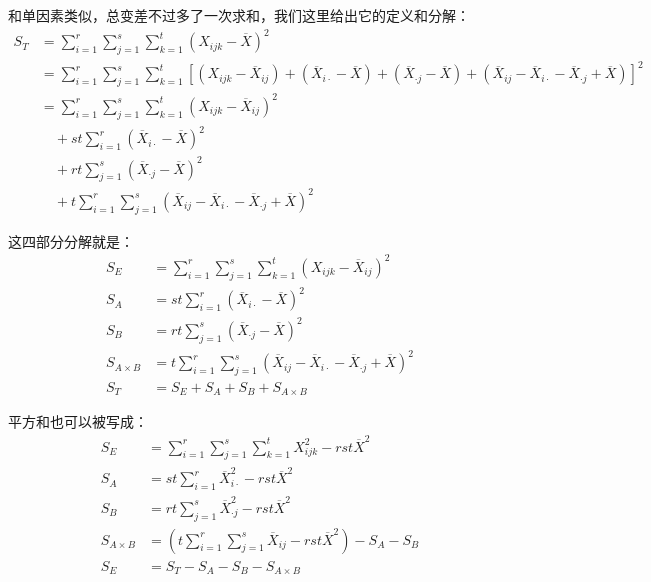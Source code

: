 和单因素类似，总变差不过多了一次求和，我们这里给出它的定义和分解：
\begin{align*}
S_T&=\sum_{i=1}^r\sum_{j=1}^s\sum_{k=1}^t(X_{ijk}-\overline{X})^2\\
&= \sum_{i=1}^r\sum_{j=1}^s\sum_{k=1}^t[(X_{ijk}-\overline{X}_{ij})
+(\overline{X}_{i\cdot}-\overline{X})
+(\overline{X}_{\cdot j}-\overline{X})
+(\overline{X}_{ij}-\overline{X}_{i\cdot}-\overline{X}_{\cdot j}+\overline{X})]^2\\
&= \sum_{i=1}^r\sum_{j=1}^s\sum_{k=1}^t(X_{ijk}-\overline{X}_{ij})^2\\
&\quad+ st\sum_{i=1}^r(\overline{X}_{i\cdot}-\overline{X})^2\\
&\quad+ rt\sum_{j=1}^s(\overline{X}_{\cdot j}-\overline{X})^2\\
&\quad+ t \sum_{i=1}^r\sum_{j=1}^s(\overline{X}_{ij}-\overline{X}_{i\cdot}-\overline{X}_{\cdot j}+\overline{X})^2
\end{align*}

这四部分分解就是：
\begin{align*}
S_E &= \sum_{i=1}^r\sum_{j=1}^s\sum_{k=1}^t(X_{ijk}-\overline{X}_{ij})^2\\
S_A &= st\sum_{i=1}^r(\overline{X}_{i\cdot}-\overline{X})^2\\
S_B &= rt\sum_{j=1}^s(\overline{X}_{\cdot j}-\overline{X})^2\\
S_{A\times B} &= t \sum_{i=1}^r\sum_{j=1}^s(\overline{X}_{ij}-\overline{X}_{i\cdot}-\overline{X}_{\cdot j}+\overline{X})^2\\
S_T &= S_E +S_A + S_B+S_{A\times B}
\end{align*}

平方和也可以被写成：
\begin{align*}
S_E &= \sum_{i=1}^r\sum_{j=1}^s\sum_{k=1}^tX_{ijk}^2-rst\overline{X}^2\\
S_A &= st\sum_{i=1}^r\overline{X}_{i\cdot}^2-rst\overline{X}^2\\
S_B &= rt\sum_{j=1}^s\overline{X}_{\cdot j}^2-rst\overline{X}^2\\
S_{A\times B} &= \left(t\sum_{i=1}^r\sum_{j=1}^s\overline{X}_{ij}-rst\overline{X}^2 \right) -S_A-S_B\\
S_E &= S_T - S_A-S_B -S_{A\times B}
\end{align*}

